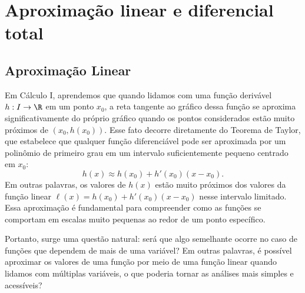 \setcounter{chapter}{6}

\chapter{Aproximação linear e diferencial total}



\section{Aproximação Linear}
Em Cálculo I, aprendemos que quando lidamos com uma função derivável \(h:I\to\R\) em um ponto \(x_0\), a reta tangente ao gráfico dessa função se aproxima significativamente do próprio gráfico quando os pontos considerados estão muito próximos de \((x_0,h(x_0))\). 
Esse fato decorre diretamente do Teorema de Taylor, que estabelece que qualquer função diferenciável pode ser aproximada por um polinômio de primeiro grau em um intervalo suficientemente pequeno centrado em \(x_0\):
$$h(x)\approx h(x_0)+h'(x_0)(x-x_0).$$
Em outras palavras, os valores de \(h(x)\) estão muito próximos dos valores da função linear \(\ell(x)= h(x_0)+h'(x_0)(x-x_0)\) nesse intervalo limitado. Essa aproximação é fundamental para compreender como as funções se comportam em escalas muito pequenas ao redor de um ponto específico.

Portanto, surge uma questão natural: será que algo semelhante ocorre no caso de funções que dependem de mais de uma variável? Em outras palavras, é possível aproximar os valores de uma função por meio de uma função linear quando lidamos com múltiplas variáveis, o que poderia tornar as análises mais simples e acessíveis?



